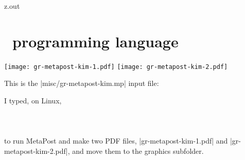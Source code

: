 \begin{VerbatimOut}{z.out}

\section{\protect\METAPOSTLogo\ programming language}
\todoindex{\METAPOSTLogo}

\todoindex{\MetaPostLogo}

\texttt{[image: gr-metapost-kim-1.pdf]}
\hspace*{0.1truein}
\texttt{[image: gr-metapost-kim-2.pdf]}

This is the |misc/gr-metapost-kim.mp| input file:

I typed, on Linux,\\
\hspace*{3\parindent}\\
\hspace*{3\parindent}\\
\hspace*{3\parindent}\\
to run MetaPost and make two PDF files, |gr-metapost-kim-1.pdf| and |gr-metapost-kim-2.pdf|,
and move them to the graphics subfolder.
\end{VerbatimOut}

\MyIO


